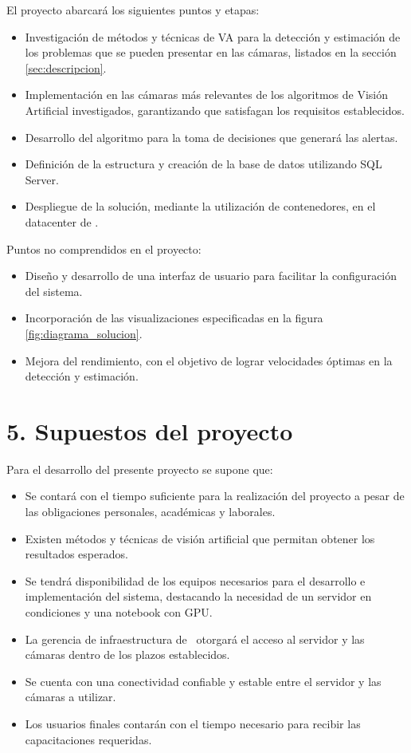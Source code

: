 \documentclass[
11pt, %
]{charter}
\begin{document}
El proyecto abarcará los siguientes puntos y etapas:

\begin{itemize}
	\item Investigación de métodos y técnicas de VA para la detección y estimación de los problemas que se pueden presentar en las cámaras, listados en la sección \ref{sec:descripcion}.
	\item Implementación en las cámaras más relevantes de los algoritmos de Visión Artificial investigados, garantizando que satisfagan los requisitos establecidos. 
	\item Desarrollo del algoritmo para la toma de decisiones que generará las alertas.
	\item Definición de la estructura y creación de la base de datos utilizando SQL Server.
	\item Despliegue de la solución, mediante la utilización de contenedores, en el datacenter de \empclientename .
\end{itemize}

Puntos no comprendidos en el proyecto:

\begin{itemize}
	\item Diseño y desarrollo de una interfaz de usuario para facilitar la configuración del sistema.
	\item Incorporación de las visualizaciones especificadas en la figura \ref{fig:diagrama_solucion}.
	\item Mejora del rendimiento, con el objetivo de lograr velocidades óptimas en la detección y estimación.
\end{itemize}


\section{5. Supuestos del proyecto}
\label{sec:supuestos}

Para el desarrollo del presente proyecto se supone que:

\begin{itemize}
	\item Se contará con el tiempo suficiente para la realización del proyecto a pesar de las obligaciones personales, académicas y laborales.
	\item Existen métodos y técnicas de visión artificial que permitan obtener los resultados esperados.
	\item Se tendrá disponibilidad de los equipos necesarios para el desarrollo e implementación del sistema, destacando la necesidad de un servidor en condiciones y una notebook con GPU.
	\item La gerencia de infraestructura de \empclientename \ otorgará el acceso al servidor y las cámaras dentro de los plazos establecidos.
	\item Se cuenta con una conectividad confiable y estable entre el servidor y las cámaras a utilizar.
	\item Los usuarios finales contarán con el tiempo necesario para recibir las capacitaciones requeridas.
\end{itemize}
\end{document}
